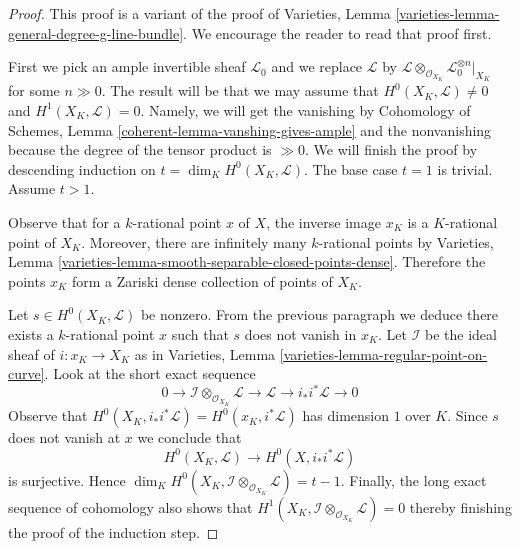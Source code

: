 \documentclass[10pt,a4paper]{amsart}
\theoremstyle{plain}
\theoremstyle{definition}
\theoremstyle{remark}
\numberwithin{equation}{subsection}
\begin{document}
\begin{proof}
This proof is a variant of the proof of
Varieties, Lemma \ref{varieties-lemma-general-degree-g-line-bundle}.
We encourage the reader to read that proof first.

\medskip\noindent
First we pick an ample invertible sheaf $\mathcal{L}_0$ and
we replace $\mathcal{L}$ by
$\mathcal{L} \otimes_{\mathcal{O}_{X_K}} \mathcal{L}_0^{\otimes n}|_{X_K}$
for some $n \gg 0$. The result will be that we may assume that
$H^0(X_K, \mathcal{L}) \not = 0$ and $H^1(X_K, \mathcal{L}) = 0$.
Namely, we will get the vanishing by Cohomology of Schemes, Lemma
\ref{coherent-lemma-vanshing-gives-ample} and the nonvanishing because
the degree of the tensor product is $\gg 0$.
We will finish the proof by descending induction on
$t = \dim_K H^0(X_K, \mathcal{L})$. The base case $t = 1$ is trivial.
Assume $t > 1$.

\medskip\noindent
Observe that for a $k$-rational point $x$ of $X$, the inverse image $x_K$
is a $K$-rational point of $X_K$. Moreover, there are infinitely many
$k$-rational points by Varieties, Lemma
\ref{varieties-lemma-smooth-separable-closed-points-dense}. Therefore
the points $x_K$ form a Zariski dense collection of points of $X_K$.

\medskip\noindent
Let $s \in H^0(X_K, \mathcal{L})$ be nonzero. From the previous paragraph
we deduce there exists a $k$-rational
point $x$ such that $s$ does not vanish in $x_K$. Let $\mathcal{I}$
be the ideal sheaf of $i : x_K \to X_K$ as in
Varieties, Lemma \ref{varieties-lemma-regular-point-on-curve}. Look at the
short exact sequence
$$
0 \to \mathcal{I} \otimes_{\mathcal{O}_{X_K}} \mathcal{L} \to
\mathcal{L} \to i_*i^*\mathcal{L} \to 0
$$
Observe that $H^0(X_K, i_*i^*\mathcal{L}) = H^0(x_K, i^*\mathcal{L})$
has dimension $1$ over $K$. Since $s$ does not vanish at $x$ we conclude that
$$
H^0(X_K, \mathcal{L}) \longrightarrow H^0(X, i_*i^*\mathcal{L})
$$
is surjective. Hence
$\dim_K H^0(X_K, \mathcal{I} \otimes_{\mathcal{O}_{X_K}} \mathcal{L}) = t - 1$.
Finally, the long exact sequence of cohomology also shows that
$H^1(X_K, \mathcal{I} \otimes_{\mathcal{O}_{X_K}} \mathcal{L}) = 0$
thereby finishing the proof of the induction step.
\end{proof}
\end{document}
